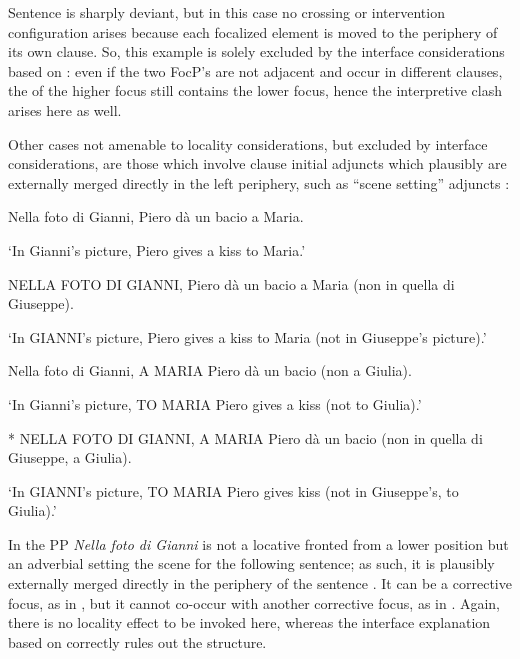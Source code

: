 \documentclass[output=paper]{LSP/langsci}
\begin{document}

\z
\z

Sentence  is sharply deviant, but in this case no crossing or intervention configuration arises because each focalized element is moved to the periphery of its own clause. So, this example is solely excluded by the interface considerations based on : even if the two FocP’s are not adjacent and occur in different clauses, the  of the higher focus still contains the lower focus, hence the interpretive clash arises here as well.

Other cases not amenable to locality considerations, but excluded by interface considerations, are those which involve clause initial adjuncts which plausibly are externally merged directly in the left periphery, such as “scene setting” adjuncts  \citep{BenincàPoletto2004}:

\ea%
    \label{ex:rizzi:7}
\ea \label{ex:rizzi:7a}  Nella foto di Gianni, Piero dà un bacio a Maria.

\glt ‘In Gianni’s picture, Piero gives a kiss to Maria.’

 \ex \label{ex:rizzi:7b}  NELLA FOTO DI GIANNI, Piero dà un bacio a Maria (non in quella di Giuseppe).

 \glt ‘In GIANNI’s picture, Piero gives a kiss to Maria (not in Giuseppe’s picture).'

 \ex  \label{ex:rizzi:7c}  Nella foto di Gianni,  A MARIA Piero dà un bacio (non a Giulia).

 \glt ‘In Gianni’s picture, TO MARIA Piero gives a kiss (not to Giulia).'

 \ex \label{ex:rizzi:7d}  * NELLA FOTO DI GIANNI, A MARIA Piero dà un bacio (non in quella di Giuseppe, a Giulia).

 \glt ‘In GIANNI’s picture, TO MARIA Piero gives kiss (not in Giuseppe’s, to Giulia).’  
\z
\z

In  the PP \textit{Nella foto di Gianni} is not a locative fronted from a lower position but an adverbial setting the scene for the following sentence; as such, it is plausibly externally merged directly in the periphery of the sentence \citep{Reinhart1981}. It can be a corrective focus, as in , but it cannot co-occur with another corrective focus, as in . Again, there is no locality effect to be invoked here, whereas the interface explanation based on  correctly rules out the structure. 
\end{document}
